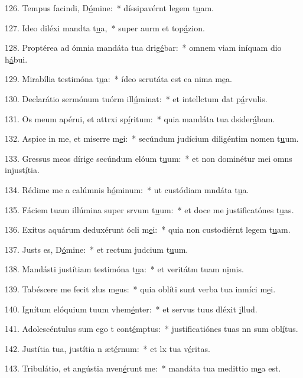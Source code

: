 126. Tempus facindi, D\uline{ó}mine:~* díssipavérnt legem t\uline{u}am.\par 
127. Ideo diléxi mandta t\uline{u}a,~* super aurm et top\uline{á}zion.\par 
128. Proptérea ad ómnia mandáta tua drig\uline{é}bar:~* omnem viam iníquam dio h\uline{á}bui.\par 
129. Mirabília testimóna t\uline{u}a:~* ídeo scrutáta est ea nima m\uline{e}a.\par 
130. Declarátio sermónum tuórm ill\uline{ú}minat:~* et intellctum dat p\uline{á}rvulis.\par 
131. Os meum apérui, et attrxi sp\uline{í}ritum:~* quia mandáta tua dsider\uline{á}bam.\par 
132. Aspice in me, et miserre m\uline{e}i:~* secúndum judícium diligéntim nomen t\uline{u}um.\par 
133. Gressus meos dírige secúndum elóum t\uline{u}um:~* et non dominétur mei omns injust\uline{í}tia.\par 
134. Rédime me a calúmnis h\uline{ó}minum:~* ut custódiam mndáta t\uline{u}a.\par 
135. Fáciem tuam illúmina super srvum t\uline{u}um:~* et doce me justificatónes t\uline{u}as.\par 
136. Exitus aquárum deduxérunt ócli m\uline{e}i:~* quia non custodiérnt legem t\uline{u}am.\par 
137. Justs es, D\uline{ó}mine:~* et rectum judcium t\uline{u}um.\par 
138. Mandásti justítiam testimóna t\uline{u}a:~* et veritátm tuam n\uline{i}mis.\par 
139. Tabéscere me fecit zlus m\uline{e}us:~* quia oblíti sunt verba tua inmíci m\uline{e}i.\par 
140. Ignítum elóquium tuum vhem\uline{é}nter:~* et servus tuus dléxit \uline{i}llud.\par 
141. Adolescéntulus sum ego t cont\uline{é}mptus:~* justificatiónes tuas nn sum obl\uline{í}tus.\par 
142. Justítia tua, justítia n æt\uline{é}rnum:~* et lx tua v\uline{é}ritas.\par 
143. Tribulátio, et angústia nven\uline{é}runt me:~* mandáta tua medittio m\uline{e}a est.\par 
